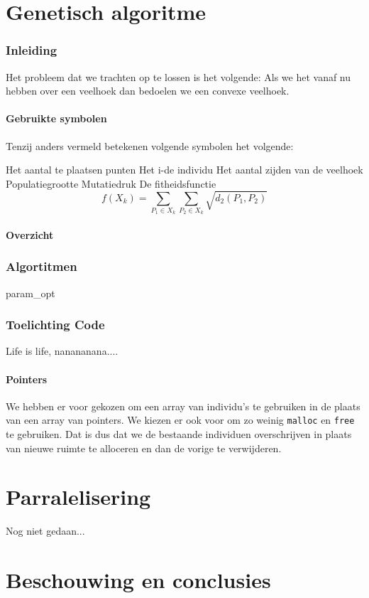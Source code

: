 

\part{Genetisch algoritme}
\section{Inleiding}
\label{sec:inleiding}
Het probleem dat we trachten op te lossen is het volgende: %
Als we het vanaf nu hebben over een veelhoek dan bedoelen we een convexe veelhoek.

\subsection{Gebruikte symbolen}
Tenzij anders vermeld betekenen volgende symbolen het volgende:
\begin{itemize}
 Het aantal te plaatsen punten
 Het i-de individu 
 Het aantal zijden van de veelhoek
 Populatiegrootte
 Mutatiedruk 
 De fitheidsfunctie \[f(X_k)= \sum_{P_1 \in X_k}\sum_{P_2 \in X_k} \sqrt{d_2(P_1,P_2)} \]
\end{itemize}

\subsection{Overzicht}
\tableofcontents


\section{Algortitmen}






 {param_opt}

\section{Toelichting Code}
Life is life, nanananana....
\label{sec:explainationcode}
\subsection{Pointers}
\label{sub:pointer}
We hebben er voor gekozen om een array van individu's te gebruiken in de plaats van een array van pointers. We kiezen er ook voor om zo weinig \texttt{malloc} en \texttt{free} te gebruiken. Dat is dus dat we de bestaande individuen overschrijven in plaats van nieuwe ruimte te alloceren en dan de vorige te verwijderen.

\part{Parralelisering}
Nog niet gedaan...

\part{Beschouwing en conclusies}



